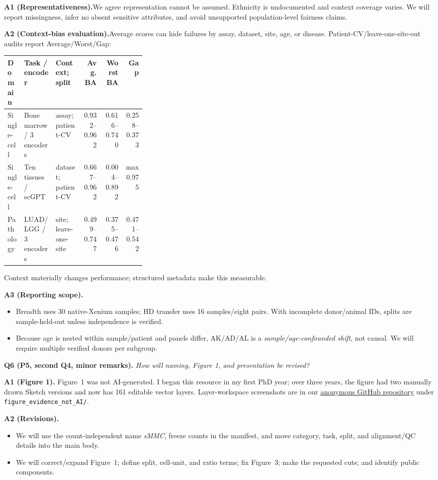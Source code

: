 \documentclass[10pt]{article}
\newcommand{\questionsep}{\par\vspace{1.1em}}
\begin{document}
\textbf{A1 (Representativeness).}\enspace We agree representation cannot be
assumed. Ethnicity is undocumented and context coverage varies. We will report
missingness, infer no absent sensitive attributes, and avoid unsupported
population-level fairness claims.

\textbf{A2 (Context-bias evaluation).}\enspace Average scores can hide failures
by assay, dataset, site, age, or disease. Patient-CV/leave-one-site-out audits
report Average/Worst/Gap:

\begin{center}
\begingroup
\scriptsize
\setlength{\tabcolsep}{2.6pt}
\begin{tabularx}{\linewidth}{@{}p{0.12\linewidth}X p{0.20\linewidth}rrr@{}}
\toprule
Domain & Task / encoder & Context; split & Avg. BA & Worst BA & Gap \\
\midrule
Single-cell & Bone marrow / 3 encoders & assay; patient-CV & 0.932--0.962 &
0.616--0.740 & 0.258--0.373 \\
Single-cell & Ten tissues / scGPT & dataset; patient-CV & 0.667--0.962 &
0.004--0.892 & max 0.975 \\
Pathology & LUAD/LGG / 3 encoders & site; leave-one-site & 0.499--0.747 &
0.375--0.476 & 0.471--0.542 \\
\bottomrule
\end{tabularx}
\endgroup
\end{center}

Context materially changes performance; structured metadata make this
measurable.

\textbf{A3 (Reporting scope).}
\begin{itemize}
\item Breadth uses 30 native-Xenium samples; HD transfer uses 16 samples/eight
pairs. With incomplete donor/animal IDs, splits are sample-held-out unless
independence is verified.
\item Because age is nested within sample/patient and panels differ, AK/AD/AL
is a \emph{sample/age-confounded shift}, not causal. We will require multiple
verified donors per subgroup.
\end{itemize}

\questionsep
\textbf{Q6 (P5, second Q4, minor remarks).}\quad
\textit{How will naming, Figure 1, and presentation be revised?}

\textbf{A1 (Figure 1).}\enspace
Figure~1 was not AI-generated. I began this resource in my first PhD year; over
three years, the figure had two manually drawn Sketch versions and now has 161
editable vector layers. Layer-workspace screenshots are in our
\href{https://anonymous.4open.science/r/sMMC-22M-DB75}{anonymous GitHub
repository} under \texttt{figure\_evidence\_not\_AI/}.

\textbf{A2 (Revisions).}
\begin{itemize}
\item We will use the count-independent name \textit{sMMC}, freeze counts in
the manifest, and move category, task, split, and alignment/QC details into the
main body.
\item We will correct/expand Figure~1; define split, cell-unit, and ratio terms;
fix Figure~3; make the requested cuts; and identify public components.
\end{itemize}
\end{document}
